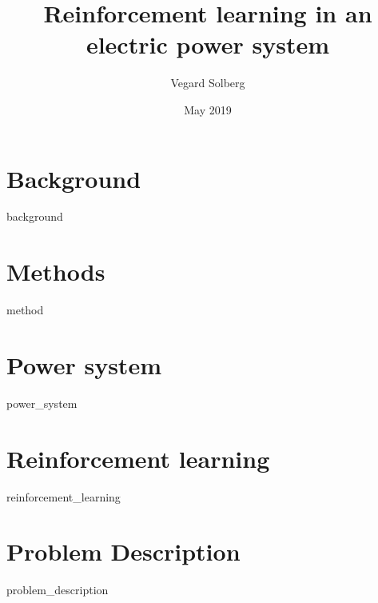 \documentclass{book}
\title{Reinforcement learning in an electric power system}
\author{Vegard Solberg}
\date{May 2019}
\begin{document}
 
    \maketitle
    \tableofcontents
    
    \chapter{Background}
    {background}
    
    \chapter{Methods}
    {method}

    
    \chapter{Power system}
    {power_system}
 
    \chapter{Reinforcement learning}
    {reinforcement_learning}
    
    \chapter{Problem Description}
    {problem_description}
    
    \printbibliography
 
\end{document}
